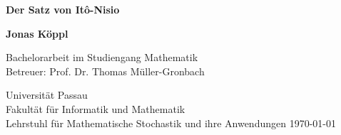 \begin{titlepage}
    \begin{center}
        \vspace*{2cm}
        \Huge
        \textbf{Der Satz von Itô-Nisio}
  
        \vfill
        \Large
        \textbf{Jonas Köppl}
  
        \vfill
  
        Bachelorarbeit im Studiengang Mathematik \\
        Betreuer: Prof. Dr. Thomas Müller-Gronbach
        
        \vspace{0.8cm}
  
  
        Universität Passau\\
        Fakultät für Informatik und Mathematik\\
        Lehrstuhl für Mathematische Stochastik und ihre Anwendungen
        \today
  
    \end{center}
 \end{titlepage}